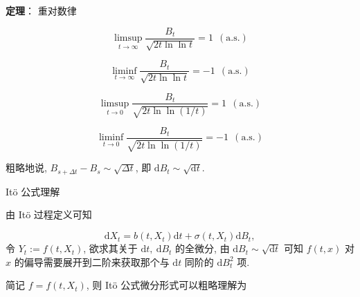 \documentclass[openany]{ctexbook}
\theoremstyle{kaiti}
\theoremstyle{normal}
\begin{document}
\textbf{定理}： 重对数律

\begin{equation}
  \limsup_{t\to\infty}\frac{B_t}{\sqrt{2t\ln\ln t}}=1~~(\text{a.s.})
\end{equation}

\begin{equation}
  \liminf_{t\to\infty}\frac{B_t}{\sqrt{2t\ln\ln t}}=-1~~(\text{a.s.})
\end{equation}

\begin{equation}
  \limsup_{t\to0}\frac{B_t}{\sqrt{2t\ln\ln (1/t)}}=1~~(\text{a.s.})
\end{equation}

\begin{equation}
  \liminf_{t\to0}\frac{B_t}{\sqrt{2t\ln\ln (1/t)}}=-1~~(\text{a.s.})
\end{equation}

粗略地说, $B_{s+\Delta t}-B_s\sim\sqrt{\Delta t}$, 即 $\mathrm{d}B_t\sim\sqrt{\mathrm{d}t}$.

It\"o 公式理解

由 It\"o 过程定义可知

\begin{equation}
  \mathrm{d}X_t=b(t,X_t)\mathrm{d}t+\sigma(t,X_t)\mathrm{d}B_t,
\end{equation}
令 $Y_t:= f(t,X_t)$, 欲求其关于 $\mathrm{d}t,~\mathrm{d}B_t$ 的全微分, 由 $\mathrm{d}B_t\sim\sqrt{\mathrm{d}t}$ 可知 $f(t,x)$ 对 $x$ 的偏导需要展开到二阶来获取那个与 $\mathrm{d}t$ 同阶的 $\mathrm{d}B_t^2$ 项.

简记 $f=f(t,X_t)$, 则 It\"o 公式微分形式可以粗略理解为
\end{document}
